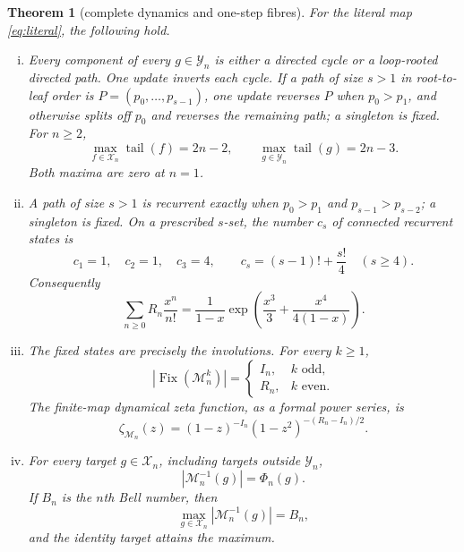 \documentclass[a4paper,10pt]{amsart}
\newtheorem{theorem}{Theorem}
\theoremstyle{remark}
\newcommand{\M}{\mathcal M}
\newcommand{\X}{\mathcal X}
\newcommand{\Y}{\mathcal Y}
\newcommand{\Fix}{\operatorname{Fix}}
\newcommand{\tail}{\operatorname{tail}}
\begin{document}
\begin{theorem}[complete dynamics and one-step fibres]\label{thm:main}
For the literal map \eqref{eq:literal}, the following hold.
\begin{enumerate}[(i)]
\item Every component of every $g\in\Y_n$ is either a directed cycle or a
loop-rooted directed path.  One update inverts each cycle.  If a path of
size $s>1$ in root-to-leaf order is $P=(p_0,\ldots,p_{s-1})$, one update
reverses $P$ when $p_0>p_1$, and otherwise splits off $p_0$ and reverses the
remaining path; a singleton is fixed.
For $n\geq2$,
\begin{equation}\label{eq:heights}
 \max_{f\in\X_n}\tail(f)=2n-2,
 \qquad \max_{g\in\Y_n}\tail(g)=2n-3.
\end{equation}
Both maxima are zero at $n=1$.

\item A path of size $s>1$ is recurrent exactly when
$p_0>p_1$ and $p_{s-1}>p_{s-2}$; a singleton is fixed.  On a prescribed
$s$-set, the number $c_s$ of connected recurrent states is
\begin{equation}\label{eq:connected}
 c_1=1,\quad c_2=1,\quad c_3=4,\qquad
 c_s=(s-1)!+\frac{s!}{4}\quad(s\geq4).
\end{equation}
Consequently
\begin{equation}\label{eq:rec-egf}
 \sum_{n\geq0}R_n\frac{x^n}{n!}
 =\frac{1}{1-x}\exp\!\left(\frac{x^3}{3}
       +\frac{x^4}{4(1-x)}\right).
\end{equation}

\item The fixed states are precisely the involutions.  For every $k\geq1$,
\begin{equation}\label{eq:iterate-fix}
 |\Fix(\M_n^k)|=
 \begin{cases}I_n,&k\text{ odd},\\R_n,&k\text{ even}.
 \end{cases}
\end{equation}
The finite-map dynamical zeta function, as a formal power series, is
\begin{equation}\label{eq:zeta}
 \zeta_{\M_n}(z)=(1-z)^{-I_n}
 (1-z^2)^{-(R_n-I_n)/2}.
\end{equation}

\item For every target $g\in\X_n$, including targets outside $\Y_n$,
\begin{equation}\label{eq:fibre}
 |\M_n^{-1}(g)|=\Phi_n(g).
\end{equation}
If $B_n$ is the $n$th Bell number, then
\begin{equation}\label{eq:bell}
 \max_{g\in\X_n}|\M_n^{-1}(g)|=B_n,
\end{equation}
and the identity target attains the maximum.


\end{enumerate}
\end{theorem}
\end{document}
